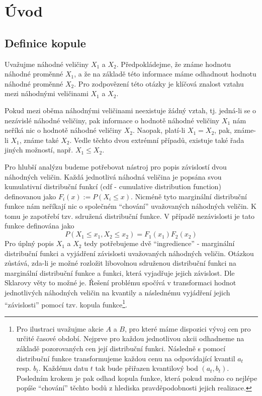 \chapter{Úvod}

\section{Definice kopule}

Uvažujme náhodné veličiny $X_1$ a $X_2$. Předpokládejme, že známe hodnotu náhodné proměnné $X_1$, a že na základě této informace máme odhadnout hodnotu náhodné proměnné $X_2$. Pro zodpovězení této otázky je klíčová znalost vztahu mezi náhodnými veličinami $X_1$ a $X_2$.

Pokud mezi oběma náhodnými veličinami neexistuje žádný vztah, tj. jedná-li se o nezávislé náhodné veličiny, pak informace o hodnotě náhodné veličiny $X_1$ nám neříká nic o hodnotě náhodné veličiny $X_2$. Naopak, platí-li $X_1 = X_2$, pak, známe-li $X_1$, známe také $X_2$. Vedle těchto dvou extrémní případů, existuje také řada jiných možností, např. $X_1 \le X_2$.

Pro hlubší analýzu budeme potřebovat nástroj pro popis závislostí dvou náhodných veličin. Každá jednotlivá náhodná veličina je popsána svou kumulativní distribuční funkcí (cdf - cumulative distribution function) definovanou jako $F_i(x) := P(X_i \le x)$. Nicméně tyto marginální distribuční funkce nám neříkají nic o společném ``chování'' uvažovaných náhodných veličin. K tomu je zapotřebí tzv. sdružená distribuční funkce. V případě nezávislosti je tato funkce definována jako
\begin{equation*}
P(X_1 \le x_1, X_2 \le x_2) = F_1(x_1)F_2(x_2)
\end{equation*}
Pro úplný popis $X_1$ a $X_2$ tedy potřebujeme dvě ``ingredience'' - marginální distribuční funkci a vyjádření závislosti uvažovaných náhodných veličin. Otázkou zůstává, zda-li je možné rozložit libovolnou sdruženou distribuční funkci na marginální distribuční funkce a funkci, která vyjadřuje jejich závislost. Dle Sklarovy věty to možné je. Řešení problému spočívá v transformaci hodnot jednotlivých náhodných veličin na kvantily a následnému vyjádření jejich ``závislosti'' pomocí tzv. kopula funkce\footnote{Pro ilustraci uvažujme akcie $A$ a $B$, pro které máme dispozici vývoj cen pro určité časové období. Nejprve pro každou jednotlivou akcii odhadneme na základě pozorovaných cen její distribuční funkci. Následně s pomocí distribuční funkce transformujeme každou cenu na odpovídající kvantil $a_t$ resp. $b_t$. Každému datu $t$ tak bude přiřazen kvantilový bod $(a_t, b_t)$. Posledním krokem je pak odhad kopula funkce, která pokud možno co nejlépe popíše ``chování'' těchto bodů z hlediska pravděpodobnosti jejich realizace.}.

